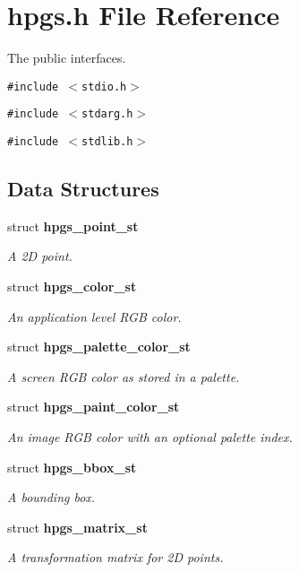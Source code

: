 \section{hpgs.h File Reference}
\label{hpgs_8h}
The public interfaces. 

{\tt \#include $<$stdio.h$>$}\par
{\tt \#include $<$stdarg.h$>$}\par
{\tt \#include $<$stdlib.h$>$}\par
\subsection*{Data Structures}
\begin{CompactItemize}
\item 
struct {\bf hpgs\_\-point\_\-st}
\begin{CompactList}\small\item\em A 2D point. \item\end{CompactList}\item 
struct {\bf hpgs\_\-color\_\-st}
\begin{CompactList}\small\item\em An application level RGB color. \item\end{CompactList}\item 
struct {\bf hpgs\_\-palette\_\-color\_\-st}
\begin{CompactList}\small\item\em A screen RGB color as stored in a palette. \item\end{CompactList}\item 
struct {\bf hpgs\_\-paint\_\-color\_\-st}
\begin{CompactList}\small\item\em An image RGB color with an optional palette index. \item\end{CompactList}\item 
struct {\bf hpgs\_\-bbox\_\-st}
\begin{CompactList}\small\item\em A bounding box. \item\end{CompactList}\item 
struct {\bf hpgs\_\-matrix\_\-st}
\begin{CompactList}\small\item\em A transformation matrix for 2D points. \item\end{CompactList}\item 

\end{CompactItemize}
